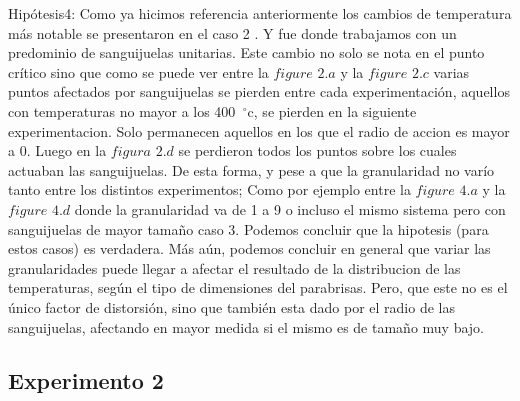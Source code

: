 Hipótesis4: Como ya hicimos referencia anteriormente los cambios de temperatura más notable se presentaron en el caso 2 . Y fue donde trabajamos con un predominio de sanguijuelas unitarias. Este cambio no solo se nota en el punto crítico sino que como se puede ver entre la $figure$ $2.a$ y la $figure$ $2.c$ varias puntos afectados por sanguijuelas se pierden entre cada experimentación, aquellos con temperaturas no mayor a los 400\hspace{-1.5mm}$\phantom{a}^{\circ}$c, se pierden en la siguiente experimentacion. Solo permanecen aquellos en los que el radio de accion es mayor a 0. Luego en la $figura$ $2.d$ se perdieron todos los puntos sobre los cuales actuaban las sanguijuelas. De esta forma, y pese a que la granularidad no varío tanto entre los distintos experimentos; Como por ejemplo entre la $figure$ $4.a$ y la $figure$ $4.d$ donde la granularidad va de 1 a 9 o  incluso el mismo sistema pero  con sanguijuelas de mayor tamaño caso 3. Podemos concluir que la hipotesis (para estos casos) es verdadera. Más aún, podemos concluir en general que variar las granularidades puede llegar a afectar el resultado de la distribucion de las temperaturas, según el tipo de dimensiones del parabrisas. Pero, que este no es el único factor de distorsión, sino que también esta dado por el radio de las sanguijuelas, afectando en mayor medida si el mismo es de tamaño muy bajo.  


\subsection{Experimento 2}
